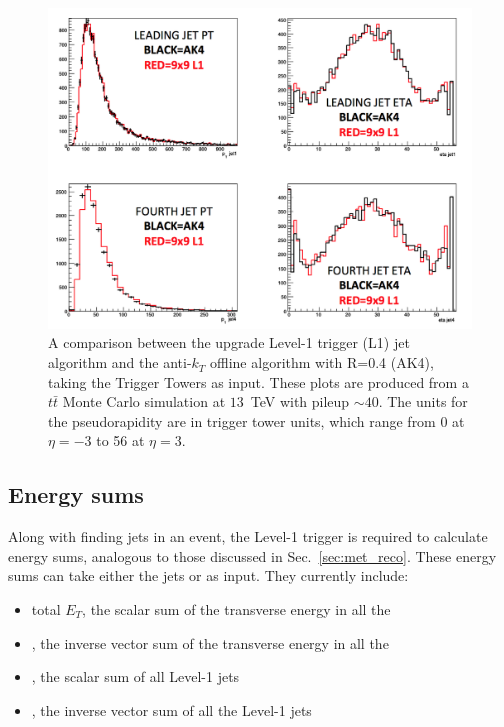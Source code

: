 \begin{figure}
	\begin{center}
		\includegraphics[width=1.0\linewidth]{figs/trigger/jet_l1s2_compak4}
	\end{center}
  \caption{A comparison between the upgrade Level-1 trigger (L1) jet
  algorithm and the anti-$k_T$ offline algorithm with R=0.4 
  (AK4), taking
  the Trigger Towers as input.  These plots are produced from a
  $t\bar{t}$ Monte Carlo simulation at $13$~TeV with pileup $\sim40$.
  The units for the pseudorapidity are in trigger tower units, which
  range from 0 at $\eta =-3$ to 56 at $\eta=3$.}
	\label{fig:ak4_comp}
\end{figure}

\subsection{Energy sums}

Along with finding jets in an event, the Level-1 trigger is required
to calculate energy sums, analogous to those discussed in
Sec.~\ref{sec:met_reco}.  These energy sums can take either the jets
or \TT as input. They currently include:
\begin{itemize}
\item{total $E_T$, the scalar sum of the transverse energy in all the \TT}
\item{\met, the inverse vector sum of the transverse energy in all the
\TT}
\item{\HT, the scalar sum of all Level-1 jets}
\item{\MHT, the inverse vector sum of all the Level-1 jets}
\end{itemize}

